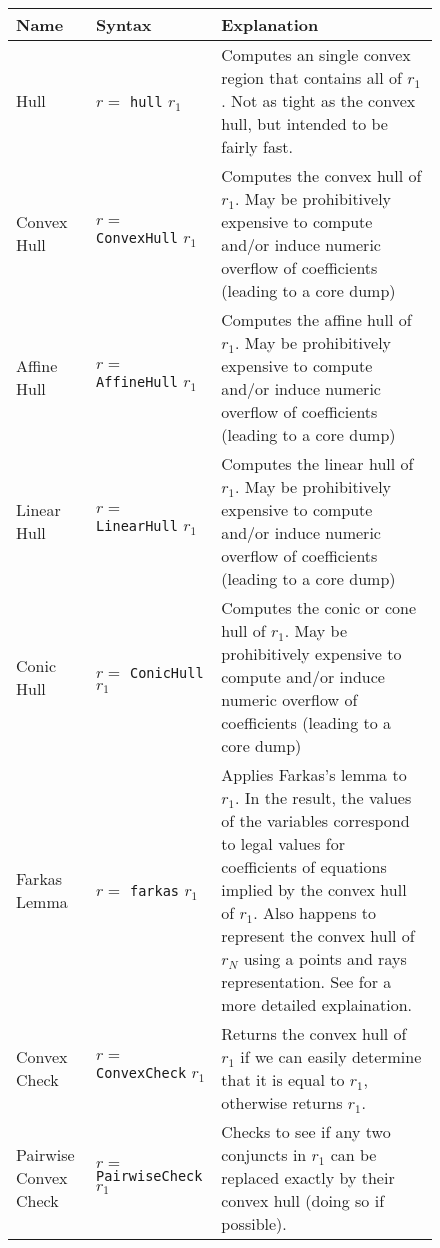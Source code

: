 \begin{figure}[tbp]
\begin{tabular}{l|l|p{3.5in}}
Name & Syntax & Explanation \\\hline

Hull & $r=$ {\tt hull} $r_1$ & Computes an single convex region that
contains all of $r_1$.  Not as tight as the convex hull, but intended
to be fairly fast.  \\

Convex Hull &
$r=$ {\tt ConvexHull} $r_1$ &
Computes the convex hull \cite{Schrijver86,Wilde93} of $r_1$.
May be prohibitively expensive to compute
and/or induce numeric overflow of coefficients (leading
to a core dump)
\\

Affine Hull &
$r=$ {\tt AffineHull} $r_1$ &
Computes the affine hull \cite{Schrijver86,Wilde93} of $r_1$.
May be prohibitively expensive to compute
and/or induce numeric overflow of coefficients (leading
to a core dump)
\\

Linear Hull &
$r=$ {\tt LinearHull} $r_1$ &
Computes the linear hull \cite{Schrijver86,Wilde93} of $r_1$.
May be prohibitively expensive to compute
and/or induce numeric overflow of coefficients (leading
to a core dump)
\\

Conic Hull &
$r=$ {\tt ConicHull} $r_1$ &
Computes the conic or cone hull \cite{Schrijver86,Wilde93} of $r_1$.
May be prohibitively expensive to compute
and/or induce numeric overflow of coefficients (leading
to a core dump)
\\

Farkas Lemma &
$r=$ {\tt farkas} $r_1$ &
Applies Farkas's lemma \cite{Schrijver86,Wilde93} to $r_1$.
In the result, the values of the variables
correspond to legal values for coefficients
of equations implied by the convex hull of $r_1$.
Also happens to represent the convex hull of $r_N$
using a points and rays representation. 	 
See \cite{Wilde93} for a more detailed explaination.
\\

Convex Check &
$r=$ {\tt ConvexCheck} $r_1$ &
Returns the convex hull of $r_1$ if we can easily determine
that it is equal to $r_1$, otherwise returns $r_1$.
\\

Pairwise Convex Check &
$r=$ {\tt PairwiseCheck} $r_1$ &
Checks to see if any two conjuncts in $r_1$ can be replaced
exactly by their convex hull (doing so if possible).
\\


\end{tabular}
\end{figure}
